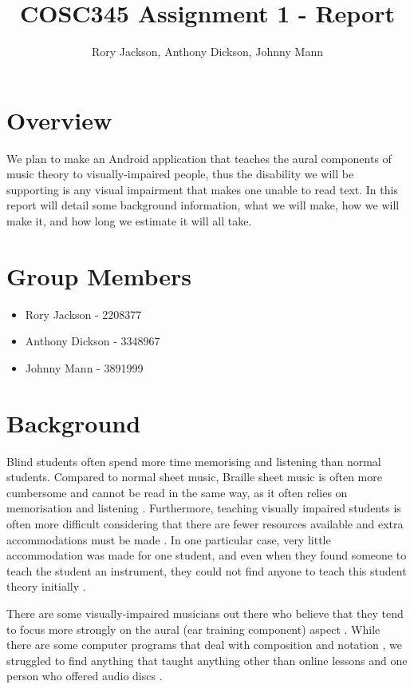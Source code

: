 \documentclass{article}
\title{COSC345 Assignment 1 - Report}
\author{Rory Jackson, Anthony Dickson, Johnny Mann}
\begin{document}
	
\maketitle
\tableofcontents

\section{Overview}
We plan to make an Android application that teaches the aural components of music theory to visually-impaired people, thus the disability we will be supporting is any visual impairment that makes one unable to read text. In this report will detail some background information, what we will make, how we will make it, and how long we estimate it will all take.

\section{Group Members}
\begin{itemize}
	\item Rory Jackson - 2208377
	\item Anthony Dickson - 3348967
	\item Johnny Mann - 3891999
\end{itemize}
	
\section{Background}
Blind students often spend more time memorising and listening than normal students. Compared to normal sheet music, Braille sheet music is often more cumbersome and cannot be read in the same way, as it often relies on memorisation and listening \cite{teachingcollege}. Furthermore, teaching visually impaired students is often more difficult considering that there are fewer resources available and extra accommodations must be made \cite{mtosmt}. In one particular case, very little accommodation was made for one student, and even when they found someone to teach the student an instrument, they could not find anyone to teach this student theory initially \cite{thestar}. 

There are some visually-impaired musicians out there who believe that they tend to focus more strongly on the aural (ear training component) aspect \cite{stuff}\cite{ncbi}. While there are some computer programs that deal with composition and notation \cite{nydailynews}, we struggled to find anything that taught anything other than online lessons and one person who offered audio discs \cite{musicfortheblind}. 
\end{document}
